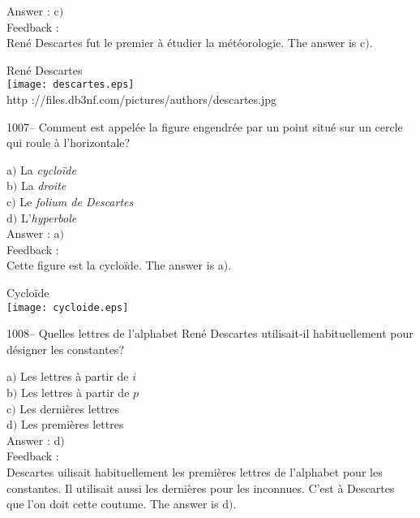 \documentclass[letterpaper, 12pt]{article}
\begin{document}
Answer : c$)$\\

Feedback : \\
Ren\'e Descartes fut le premier \`a \'etudier la m\'et\'eorologie.
The answer is c$)$.\\

        \begin{center}
        Ren\'e Descartes\\
    \texttt{[image: descartes.eps]}\\
        {\footnotesize http
://files.db3nf.com/pictures/authors/descartes.jpg}
    \end{center}

1007-- Comment est appel\'ee la figure engendr\'ee par un point situ\'e sur
un cercle qui roule \`a l'horizontale?

a$)$ La {\sl cyclo\"ide} \\
b$)$ La {\sl droite} \\
c$)$ Le {\sl folium de Descartes} \\
d$)$ L'{\sl hyperbole}\\

Answer : a$)$\\

Feedback : \\
Cette figure est la cyclo\"ide.
The answer is a$)$.\\

        \begin{center}
       Cyclo\"ide \\
    \texttt{[image: cycloide.eps]}\\
    \end{center}

1008-- Quelles lettres de l'alphabet Ren\'e Descartes utilisait-il
habituellement pour d\'esigner les constantes?

a$)$ Les lettres \`a partir de $i$ \\
b$)$ Les lettres \`a partir de $p$ \\
c$)$ Les derni\`eres lettres \\
d$)$ Les premi\`eres lettres\\

Answer : d$)$\\

Feedback : \\
Descartes uilisait habituellement les premi\`eres lettres de
l'alphabet pour les constantes. Il utilisait aussi les derni\`eres
pour les inconnues. C'est \`a Descartes que l'on doit cette coutume.
The answer is d$)$.\\
\end{document}
